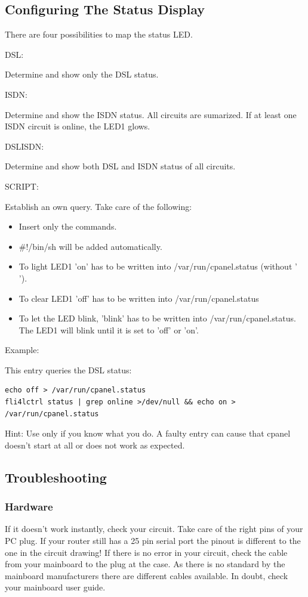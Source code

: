 \subsection{Configuring The Status Display}

There are four possibilities to map the status LED.

DSL: 

Determine and show only the DSL status.

ISDN: 

Determine and show the ISDN status. All circuits are sumarized. If at least
one ISDN circuit is online, the LED1 glows.

DSLISDN:

Determine and show both DSL and ISDN status of all circuits.

SCRIPT:

Establish an own query. Take care of the following:
\begin{itemize}
    \item Insert only the commands.
    \item \#!/bin/sh will be added automatically.
    \item To light LED1 'on' has to be written into /var/run/cpanel.status (without ' ').
    \item To clear LED1 'off' has to be written into /var/run/cpanel.status 
    \item To let the LED blink, 'blink' has to be written into /var/run/cpanel.status. 
          The LED1 will blink until it is set to 'off' or 'on'.
\end{itemize}

Example:

This entry queries the DSL status:
\begin{verbatim}
echo off > /var/run/cpanel.status
fli4lctrl status | grep online >/dev/null && echo on > /var/run/cpanel.status
\end{verbatim}
Hint:
Use only if you know what you do. A faulty entry can cause that cpanel doesn't start
at all or does not work as expected.

\subsection{Troubleshooting}
\subsubsection{Hardware}

If it doesn't work instantly, check your circuit. Take care of the right pins of your 
PC plug. If your router still has a 25 pin serial port the pinout is different to the one in 
the circuit drawing!
If there is no error in your circuit, check the cable from your mainboard to the plug at the 
case. As there is no standard by the mainboard manufacturers there are different cables available.
In doubt, check your mainboard user guide.

